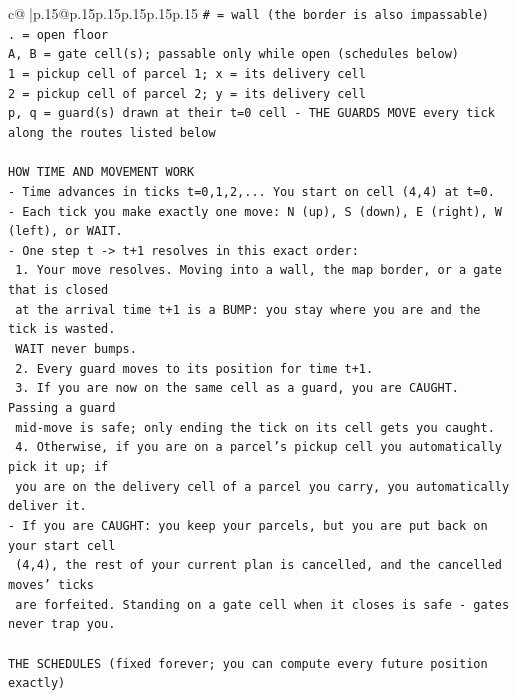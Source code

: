 \documentclass{article}
\begin{document}
{\begin{supertabular}{c@{$\;$}|p{.15\linewidth}@{}p{.15\linewidth}p{.15\linewidth}p{.15\linewidth}p{.15\linewidth}p{.15\linewidth}}
{{{\texttt{\# = wall (the border is also impassable)} \\
\texttt{. = open floor} \\
\texttt{A, B = gate cell(s); passable only while open (schedules below)} \\
\texttt{1 = pickup cell of parcel 1; x = its delivery cell} \\
\texttt{2 = pickup cell of parcel 2; y = its delivery cell} \\
\texttt{p, q = guard(s) drawn at their t=0 cell {-} THE GUARDS MOVE every tick along the routes listed below} \\
\\ 
\texttt{HOW TIME AND MOVEMENT WORK} \\
\texttt{{-} Time advances in ticks t=0,1,2,... You start on cell (4,4) at t=0.} \\
\texttt{{-} Each tick you make exactly one move: N (up), S (down), E (right), W (left), or WAIT.} \\
\texttt{{-} One step t {-}> t+1 resolves in this exact order:} \\
\texttt{  1. Your move resolves. Moving into a wall, the map border, or a gate that is closed} \\
\texttt{     at the arrival time t+1 is a BUMP: you stay where you are and the tick is wasted.} \\
\texttt{     WAIT never bumps.} \\
\texttt{  2. Every guard moves to its position for time t+1.} \\
\texttt{  3. If you are now on the same cell as a guard, you are CAUGHT. Passing a guard} \\
\texttt{     mid{-}move is safe; only ending the tick on its cell gets you caught.} \\
\texttt{  4. Otherwise, if you are on a parcel's pickup cell you automatically pick it up; if} \\
\texttt{     you are on the delivery cell of a parcel you carry, you automatically deliver it.} \\
\texttt{{-} If you are CAUGHT: you keep your parcels, but you are put back on your start cell} \\
\texttt{  (4,4), the rest of your current plan is cancelled, and the cancelled moves' ticks} \\
\texttt{  are forfeited. Standing on a gate cell when it closes is safe {-} gates never trap you.} \\
\\ 
\texttt{THE SCHEDULES (fixed forever; you can compute every future position exactly)} \\
}}}
\end{supertabular}}
\end{document}
